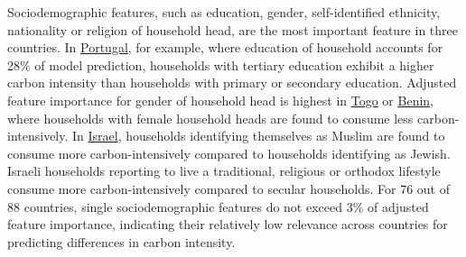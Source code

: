\documentclass[12pt, a4paper]{article}
\begin{document}
Sociodemographic features, such as education, gender, self-identified ethnicity, nationality or religion of household head, are the most important feature in three countries. In \hyperref[fig:5b_PRT]{Portugal}, for example, where education of household accounts for 28\% of model prediction, households with tertiary education exhibit a higher carbon intensity than households with primary or secondary education. Adjusted feature importance for gender of household head is highest in \hyperref[fig:5b_TGO]{Togo} or \hyperref[fig:5b_BEN]{Benin}, where households with female household heads are found to consume less carbon-intensively. In \hyperref[fig:5b_ISR]{Israel}, households identifying themselves as Muslim are found to consume more carbon-intensively compared to households identifying as Jewish. Israeli households reporting to live a traditional, religious or orthodox lifestyle consume more carbon-intensively compared to secular households. For 76 out of 88 countries, single sociodemographic features do not exceed 3\% of adjusted feature importance, indicating their relatively low relevance across countries for predicting differences in carbon intensity.
\end{document}
